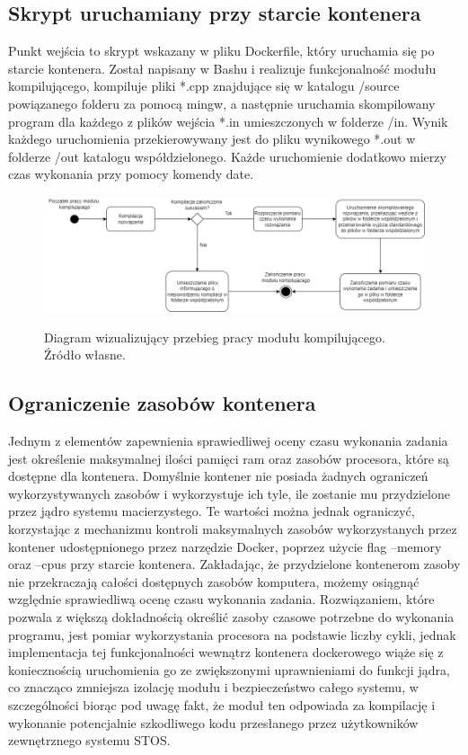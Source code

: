 \subsection{Skrypt uruchamiany przy starcie kontenera}
Punkt wejścia to skrypt wskazany w pliku Dockerfile, który uruchamia się po starcie kontenera. Został napisany w Bashu i realizuje funkcjonalność modułu kompilującego, kompiluje pliki *.cpp znajdujące się w katalogu /source powiązanego folderu za pomocą mingw, a następnie uruchamia skompilowany program dla każdego z plików wejścia *.in umieszczonych w folderze /in. Wynik każdego uruchomienia przekierowywany jest do  pliku wynikowego *.out w folderze /out katalogu współdzielonego. Każde uruchomienie dodatkowo mierzy czas wykonania przy pomocy komendy date.
\begin{figure}[!h]
	\begin{center}
		\resizebox{1\textwidth}{!} {
			\includegraphics{img/3/diagram-aktywnosci-modul-kompilujacy.png}
		}
		\caption[Diagram aktywności modułu kompilującego]{Diagram wizualizujący przebieg pracy modułu kompilującego. Źródło własne.}
		\label{diagram-aktywnosci-worker}
	\end{center}
\end{figure}

\subsection{Ograniczenie zasobów kontenera}
Jednym z elementów zapewnienia sprawiedliwej oceny czasu wykonania zadania jest określenie maksymalnej ilości pamięci ram oraz zasobów procesora, które są dostępne dla kontenera. Domyślnie kontener nie posiada żadnych ograniczeń wykorzystywanych zasobów i wykorzystuje ich tyle, ile zostanie mu przydzielone przez jądro systemu macierzystego. Te wartości można jednak ograniczyć, korzystając z mechanizmu kontroli maksymalnych zasobów wykorzystanych przez kontener udostępnionego przez narzędzie Docker\cite{dockerConstraints}, poprzez użycie flag --memory oraz --cpus przy starcie kontenera. Zakładając, że przydzielone kontenerom zasoby nie przekraczają całości dostępnych zasobów komputera, możemy osiągnąć względnie sprawiedliwą ocenę czasu wykonania zadania. Rozwiązaniem, które pozwala z większą dokładnością określić zasoby czasowe potrzebne do wykonania programu, jest pomiar wykorzystania procesora na podstawie liczby cykli, jednak implementacja tej funkcjonalności wewnątrz kontenera dockerowego wiąże się z koniecznością uruchomienia go ze zwiększonymi uprawnieniami do funkcji jądra, co znacząco zmniejsza izolację modułu i bezpieczeństwo całego systemu, w szczególności biorąc pod uwagę fakt, że moduł ten odpowiada za kompilację i wykonanie potencjalnie szkodliwego kodu przesłanego przez użytkowników zewnętrznego systemu STOS.

